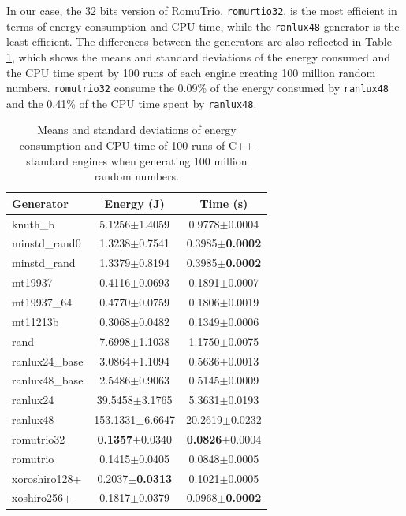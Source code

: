 \documentclass[sigconf]{acmart}
\begin{document}
In our case, the 32 bits version of RomuTrio, \texttt{romurtio32}, is the most efficient in terms of energy consumption and CPU time, while the \texttt{ranlux48} generator is the least efficient. The differences between the generators are also reflected in Table \ref{tab:pkg}, which shows the means and standard deviations of the energy consumed and the CPU time spent by 100 runs of each engine creating 100 million random numbers. \texttt{romutrio32} consume the 0.09\% of the energy consumed by \texttt{ranlux48} and the 0.41\% of the CPU time spent by \texttt{ranlux48}.

\begin{table}
\centering
\caption{Means and standard deviations of energy consumption and CPU time of 100 runs of C++ standard engines when generating 100 million random numbers.}
\begin{tabular}{lcc}
\toprule
Generator & Energy (J) & Time (s) \\
\midrule
knuth\_b & 5.1256$\pm$1.4059 & 0.9778$\pm$0.0004 \\
minstd\_rand0 & 1.3238$\pm$0.7541 & 0.3985$\pm$\textbf{0.0002} \\
minstd\_rand & 1.3379$\pm$0.8194 & 0.3985$\pm$\textbf{0.0002} \\
mt19937 & 0.4116$\pm$0.0693 & 0.1891$\pm$0.0007 \\
mt19937\_64 & 0.4770$\pm$0.0759 & 0.1806$\pm$0.0019 \\
mt11213b & 0.3068$\pm$0.0482 & 0.1349$\pm$0.0006 \\
rand & 7.6998$\pm$1.1038 & 1.1750$\pm$0.0075 \\
ranlux24\_base & 3.0864$\pm$1.1094 & 0.5636$\pm$0.0013 \\
ranlux48\_base & 2.5486$\pm$0.9063 & 0.5145$\pm$0.0009 \\
ranlux24 & 39.5458$\pm$3.1765 & 5.3631$\pm$0.0193 \\
ranlux48 & 153.1331$\pm$6.6647 & 20.2619$\pm$0.0232 \\
romutrio32 & \textbf{0.1357}$\pm$0.0340 & \textbf{0.0826}$\pm$0.0004 \\
romutrio & 0.1415$\pm$0.0405 & 0.0848$\pm$0.0005 \\
xoroshiro128+ & 0.2037$\pm$\textbf{0.0313} & 0.1021$\pm$0.0005 \\
xoshiro256+ & 0.1817$\pm$0.0379 & 0.0968$\pm$\textbf{0.0002} \\
\bottomrule
\end{tabular}
\label{tab:pkg}
\end{table}
\end{document}
